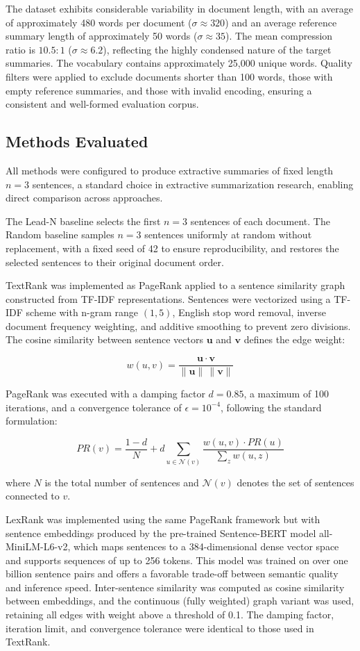 \documentclass[12pt,twoside,en,win]{bmzhart}
\begin{document}
	The dataset exhibits considerable variability in document length, with an average of approximately 480 words per 
	document ($\sigma \approx 320$) and an average reference summary length of approximately 50 words ($\sigma \approx 35$). 
	The mean compression ratio is $10.5:1$ ($\sigma \approx 6.2$), reflecting the highly condensed nature of the target 
	summaries. The vocabulary contains approximately 25,000 unique words. Quality filters were applied to exclude 
	documents shorter than 100 words, those with empty reference summaries, and those with invalid encoding, ensuring 
	a consistent and well-formed evaluation corpus.

	\subsection{Methods Evaluated}

	All methods were configured to produce extractive summaries of fixed length $n = 3$ sentences, a standard choice 
	in extractive summarization research, enabling direct comparison across approaches.

	The Lead-N baseline selects the first $n = 3$ sentences of each document. The Random baseline samples $n = 3$ 
	sentences uniformly at random without replacement, with a fixed seed of 42 to ensure reproducibility, and restores 
	the selected sentences to their original document order.

	TextRank was implemented as PageRank applied to a sentence similarity graph constructed from TF-IDF representations. 
	Sentences were vectorized using a TF-IDF scheme with n-gram range $(1, 5)$, English stop word removal, inverse 
	document frequency weighting, and additive smoothing to prevent zero divisions. The cosine similarity between 
	sentence vectors $\mathbf{u}$ and $\mathbf{v}$ defines the edge weight:

	$$w(u, v) = \frac{\mathbf{u} \cdot \mathbf{v}}{\|\mathbf{u}\| \, \|\mathbf{v}\|}$$

	PageRank was executed with a damping factor $d = 0.85$, a maximum of 100 iterations, and a convergence tolerance 
	of $\epsilon = 10^{-4}$, following the standard formulation:

	$$PR(v) = \frac{1 - d}{N} + d \sum_{u \in \mathcal{N}(v)} \frac{w(u,v) \cdot PR(u)}{\sum_{z} w(u,z)}$$

	where $N$ is the total number of sentences and $\mathcal{N}(v)$ denotes the set of sentences connected to $v$.

	LexRank was implemented using the same PageRank framework but with sentence embeddings produced by the pre-trained
	Sentence-BERT model all-MiniLM-L6-v2, which maps sentences to a 384-dimensional dense vector space and supports 
	sequences of up to 256 tokens. This model was trained on over one billion sentence pairs and offers a favorable 
	trade-off between semantic quality and inference speed. Inter-sentence similarity was computed as cosine 
	similarity between embeddings, and the continuous (fully weighted) graph variant was used, retaining all edges 
	with weight above a threshold of 0.1. The damping factor, iteration limit, and convergence tolerance were 
	identical to those used in TextRank.
\end{document}
